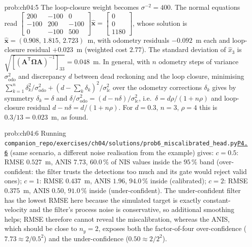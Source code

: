 \documentclass[graybox,envcountchap]{style/SNmono}
\newcommand{\repopath}[1]{\texttt{#1}}
\providecommand{\DIFadd}[1]{{\protect\color{blue} #1}} %
\providecommand{\DIFdel}[1]{{\protect\color{red} #1}} %
\DeclareRobustCommand{\RtwoDel}[1]{{\color{red}%
  \renewcommand{\DIFadd}[1]{##1}\renewcommand{\DIFdel}[1]{##1}%
  #1}}
\DeclareRobustCommand{\RtwoAdd}[1]{{\color{blue}#1}}
\DeclareRobustCommand{\codeentry}[1]{\hyperref[code:#1]{\texttt{#1}}}
\begin{document}
\begin{sol}{prob:ch04:5}
The loop-closure weight becomes $\sigma^{-2}=400$. The normal equations read
$\begin{bmatrix}200&-100&0\\-100&200&-100\\0&-100&500\end{bmatrix}\widehat{\mathbf{x}}=\begin{bmatrix}0\\0\\1180\end{bmatrix}$, whose solution is $\widehat{\mathbf{x}}=(0.908,\,1.815,\,2.723)$~m, with odometry residuals $-0.092$~m each and loop-closure residual $+0.023$~m (weighted cost $2.77$). The standard deviation of $\widehat{x}_3$ is $\sqrt{[(\mathbf{A}^{\mathsf T}\mathbf{\Omega}\mathbf{A})^{-1}]_{33}}=0.048$~m. In general, with $n$ odometry steps of variance $\sigma_{\mathrm{odo}}^{2}$ and discrepancy $d$ between dead reckoning and the loop closure, minimising $\sum_{k=1}^{n}\delta_k^{2}/\sigma_{\mathrm{odo}}^{2}+(d-\sum_k\delta_k)^{2}/\sigma_{\mathrm{lc}}^{2}$ over the odometry corrections $\delta_k$ gives by symmetry $\delta_k=\delta$ and $\delta/\sigma_{\mathrm{odo}}^{2}=(d-n\delta)/\sigma_{\mathrm{lc}}^{2}$, i.e.\ $\delta=d\rho/(1+n\rho)$ and loop-closure residual $d-n\delta=d/(1+n\rho)$. For $d=0.3$, $n=3$, $\rho=4$ this is $0.3/13=0.023$~m, as found.
\end{sol}
\begin{sol}{prob:ch04:6}
Running \RtwoDel{\repopath{companion\_\allowbreak repo/\allowbreak exercises/\allowbreak ch04/\allowbreak solutions/\allowbreak prob6\_\allowbreak miscalibrated\_\allowbreak head.py}}\RtwoAdd{\codeentry{P4.6}} (same scenario, a different noise realisation from the example) gives: $c=0.5$: RMSE $0.527$~m, ANIS $7.73$, $60.0\,\%$ of NIS values inside the $95\,\%$ band (over-confident: the filter trusts the detections too much and its gate would reject valid ones); $c=1$: RMSE $0.437$~m, ANIS $1.96$, $94.0\,\%$ inside (calibrated); $c=2$: RMSE $0.375$~m, ANIS $0.50$, $91.0\,\%$ inside (under-confident). The under-confident filter has the lowest RMSE here because the simulated target is exactly constant-velocity and the filter's process noise is conservative, so additional smoothing helps; RMSE therefore cannot reveal the miscalibration, whereas the ANIS, which should be close to $n_y=2$, exposes both the factor-of-four over-confidence ($7.73\approx 2/0.5^{2}$) and the under-confidence ($0.50\approx2/2^{2}$).
\end{sol}
\end{document}
